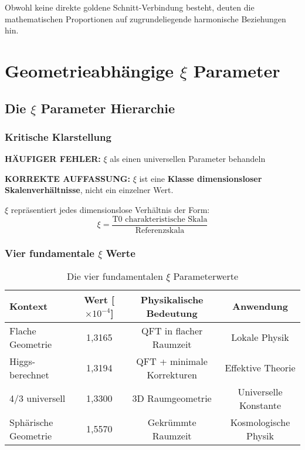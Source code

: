 \documentclass[12pt,a4paper]{article}
\newcommand{\xipar}{\ensuremath{\xi}}
\newcommand{\mytimes}{\ensuremath{\times}}
\begin{document}
	Obwohl keine direkte goldene Schnitt-Verbindung besteht, deuten die mathematischen Proportionen auf zugrundeliegende harmonische Beziehungen hin.
	
	\section{Geometrieabhängige $\xi$ Parameter}
	\label{sec:geometrieabhaengige_xi}
	
	\subsection{Die $\xi$ Parameter Hierarchie}
	\label{subsec:xi_hierarchie}
	
	\subsubsection{Kritische Klarstellung}
	\label{subsubsec:kritische_klarstellung}
	
	\begin{tcolorbox}[colback=red!10!white,colframe=red!75!black,title=KRITISCHE WARNUNG: $\xi$ Parameter Verwirrung]
		\textbf{HÄUFIGER FEHLER:} $\xi$ als einen universellen Parameter behandeln
		
		\textbf{KORREKTE AUFFASSUNG:} $\xi$ ist eine \textbf{Klasse dimensionsloser Skalenverhältnisse}, nicht ein einzelner Wert.
		
		$\xi$ repräsentiert jedes dimensionslose Verhältnis der Form:
		\begin{equation}
			\xipar = \frac{\text{T0 charakteristische Skala}}{\text{Referenzskala}}
		\end{equation}
	\end{tcolorbox}
	
	\subsubsection{Vier fundamentale $\xi$ Werte}
	\label{subsubsec:vier_fundamentale_werte}
	
	\begin{table}[htbp]
		\centering
		\begin{tabular}{lccc}
			\toprule
			\textbf{Kontext} & \textbf{Wert [$\mytimes 10^{-4}$]} & \textbf{Physikalische Bedeutung} & \textbf{Anwendung} \\
			\midrule
			Flache Geometrie & 1,3165 & QFT in flacher Raumzeit & Lokale Physik \\
			Higgs-berechnet & 1,3194 & QFT + minimale Korrekturen & Effektive Theorie \\
			4/3 universell & 1,3300 & 3D Raumgeometrie & Universelle Konstante \\
			Sphärische Geometrie & 1,5570 & Gekrümmte Raumzeit & Kosmologische Physik \\
			\bottomrule
		\end{tabular}
		\caption{Die vier fundamentalen $\xi$ Parameterwerte}
		\label{tab:vier_xi_werte}
	\end{table}
	
\end{document}
